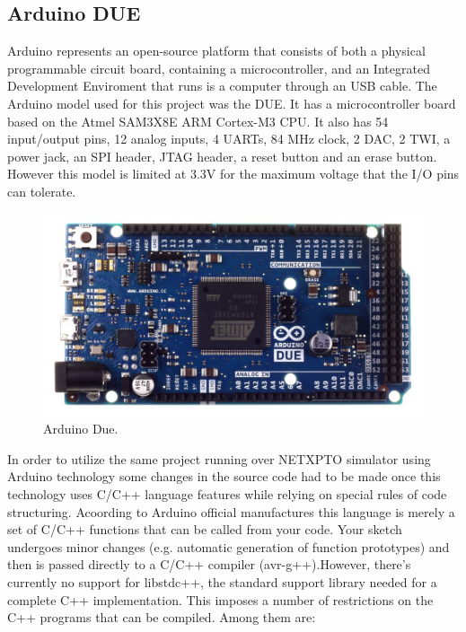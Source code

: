 \begin{refsection}
	
	    \subsection{Arduino DUE}
	     Arduino represents an open-source platform that consists of both a physical programmable circuit board, containing a microcontroller, and an  Integrated Development Enviroment that runs is a computer through an USB cable.
	    The Arduino model used for this project was the DUE. It has a microcontroller board based on the Atmel SAM3X8E ARM Cortex-M3 CPU. It also has 54 input/output pins, 12 analog inputs, 4 UARTs, 84 MHz clock, 2 DAC, 2 TWI, a power jack, an SPI header, JTAG header, a reset button and an erase button. However this model is limited at 3.3V for the maximum voltage that the I/O pins can tolerate.  
	    
	    \begin{figure}[H]
	    	\centering
	    	\includegraphics[width=0.8\linewidth]{./sdf/arduino_quantum_rx/figures/arduino.PNG}
	    	\caption{Arduino Due.}
	    	\label{fig:arduino}
	    \end{figure}
	    	
	    In order to utilize the same project running over NETXPTO simulator using Arduino technology some changes in the source code had to be made once this technology uses C/C++ language features while relying on special rules of code structuring. Acoording to Arduino official manufactures this language is merely a set of C/C++ functions that can be called from your code. Your sketch undergoes minor changes (e.g. automatic generation of function prototypes) and then is passed directly to a C/C++ compiler (avr-g++).However, there's currently no support for libstdc++, the standard support library needed for a complete C++ implementation. This imposes a number of restrictions on the C++ programs that can be compiled. Among them are:
	    

\end{refsection}
